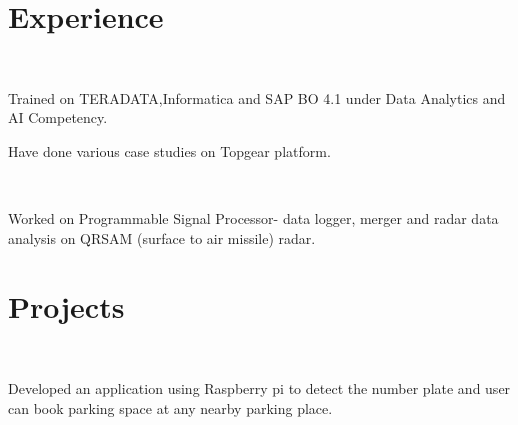 \documentclass[a4paper]{deedy-resume} %
\begin{document}
\begin{minipage}[t]{0.66\textwidth} %


\section{Experience}


\\
\vspace{\topsep} %
\begin{tightitemize}
\item Trained on TERADATA,Informatica and SAP BO 4.1 under Data Analytics and AI Competency.
\item Have done various case studies on Topgear platform.

\end{tightitemize}

\\

\begin{tightitemize}
\item Worked on Programmable Signal Processor- data logger, merger and radar data analysis on QRSAM (surface to air missile) radar.
\end{tightitemize}

\sectionspace %

\section{Projects}
\\

\begin{tightitemize}
\item Developed an application using Raspberry pi to detect the number plate and user can book parking space at any nearby parking place.
\end{tightitemize}
\sectionspace
{}\\


\end{minipage}
\end{document}
